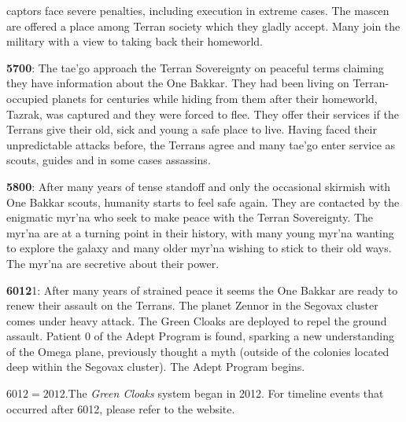 captors face severe penalties, including execution in extreme cases. The mascen are offered a place among Terran society which they gladly accept. Many join the military with a view to taking back their homeworld.

\textbf{5700}: The tae'go approach the Terran Sovereignty on peaceful terms claiming they have information about the One Bakkar. They had been living on Terran-occupied planets for centuries while hiding from them after their homeworld, Tazrak, was captured and they were forced to flee. They offer their services if the Terrans give their old, sick and young a safe place to live. Having faced their unpredictable attacks before, the Terrans agree and many tae'go enter service as scouts, guides and in some cases assassins.

\textbf{5800}: After many years of tense standoff and only the occasional skirmish with One Bakkar scouts, humanity starts to feel safe again. They are contacted by the enigmatic myr'na who seek to make peace with the Terran Sovereignty. The myr'na are at a turning point in their history, with many young myr'na wanting to explore the galaxy and many older myr'na wishing to stick to their old ways. The myr'na are secretive about their power.

\textbf{6012}1: After many years of strained peace it seems the One Bakkar are ready to renew their assault on the Terrans. The planet Zennor in the Segovax cluster comes under heavy attack. The Green Cloaks are deployed to repel the ground assault. Patient 0 of the Adept Program is found, sparking a new understanding of the Omega plane, previously thought a myth (outside of the colonies located deep within the Segovax cluster). The Adept Program begins.

601$2 = 2012. $The \textit{Green Cloaks} system began in 2012. For timeline events that occurred after 6012, please refer to the website.
